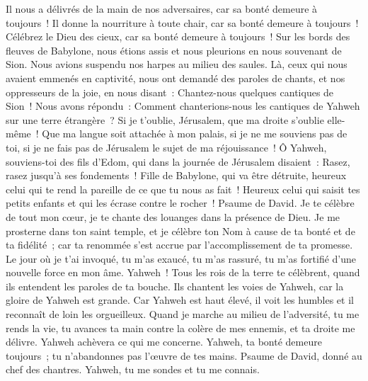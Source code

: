 \begin{multicols}{2}
Il nous a délivrés de la main de nos adversaires, car sa bonté demeure à toujours~!
Il donne la nourriture à toute chair, car sa bonté demeure à toujours~!
Célébrez le Dieu des cieux, car sa bonté demeure à toujours~!
\VerseOne{}Sur les bords des fleuves de Babylone, nous étions assis et nous pleurions en nous souvenant de Sion.
Nous avions suspendu nos harpes au milieu des saules.
Là, ceux qui nous avaient emmenés en captivité, nous ont demandé des paroles de chants, et nos oppresseurs de la joie, en nous disant~: Chantez-nous quelques cantiques de Sion~! Nous avons répondu~:
Comment chanterions-nous les cantiques de Yahweh sur une terre étrangère~?
Si je t'oublie, Jérusalem, que ma droite s'oublie elle-même~!
Que ma langue soit attachée à mon palais, si je ne me souviens pas de toi, si je ne fais pas de Jérusalem le sujet de ma réjouissance~!
Ô Yahweh, souviens-toi des fils d'Edom, qui dans la journée de Jérusalem disaient~: Rasez, rasez jusqu'à ses fondements~!
Fille de Babylone, qui va être détruite, heureux celui qui te rend la pareille de ce que tu nous as fait~!
Heureux celui qui saisit tes petits enfants et qui les écrase contre le rocher~!
\VerseOne{}Psaume de David. Je te célèbre de tout mon cœur, je te chante des louanges dans la présence de Dieu.
Je me prosterne dans ton saint temple, et je célèbre ton Nom à cause de ta bonté et de ta fidélité~; car ta renommée s'est accrue par l'accomplissement de ta promesse.
Le jour où je t'ai invoqué, tu m'as exaucé, tu m'as rassuré, tu m'as fortifié d'une nouvelle force en mon âme.
Yahweh~! Tous les rois de la terre te célèbrent, quand ils entendent les paroles de ta bouche.
Ils chantent les voies de Yahweh, car la gloire de Yahweh est grande.
Car Yahweh est haut élevé, il voit les humbles et il reconnaît de loin les orgueilleux.
Quand je marche au milieu de l'adversité, tu me rends la vie, tu avances ta main contre la colère de mes ennemis, et ta droite me délivre.
Yahweh achèvera ce qui me concerne. Yahweh, ta bonté demeure toujours~; tu n'abandonnes pas l'œuvre de tes mains.
\VerseOne{}Psaume de David, donné au chef des chantres. Yahweh, tu me sondes et tu me connais.

\end{multicols}
